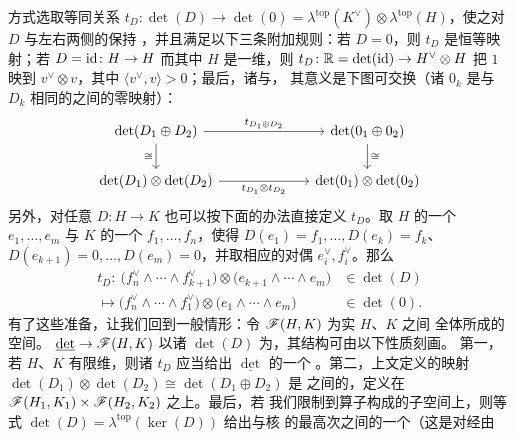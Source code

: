 方式选取等同关系 $t_D\colon\det(D)\to\det(0)=\lambda^{\mathrm{top}}(K^{\vee})\otimes
\lambda^{\mathrm{top}}(H)$，使之对 $D$ 与左右两侧\trIsomorphism{}的\trComposition{}保持%
\trCompatible，并且满足以下三条附加规则：若 $D=0$，则 $t_D$ 是恒等映射；若
$D=\mathrm{id}\colon H\to H$ 而其中 $H$ 是一维\trVectorSpace，则
$t_D\colon\mathbb{R}=\det(\mathrm{id})\to H^{\vee}\otimes H$ 把 $1$ 映到 $v^{\vee}\otimes v$，其中
$\langle v^{\vee},v\rangle>0$；最后，诸\trIsomorphism{}与\trDirectSum{}\trCompatible，
其意义是下图可交换（诸 $0_k$ 是与 $D_k$ 相同的\trVectorSpace{}之间的零映射）：
\begin{equation*}
\begin{tikzcd}[column sep=6.5em]
\det(D_1\oplus D_2)\ar[r,"t_{D_1\oplus D_2}"]\ar[d,"\cong"']
  & \det(0_1\oplus 0_2)\ar[d,"\cong"]\\
\det(D_1)\otimes\det(D_2)\ar[r,"t_{D_1}\otimes t_{D_2}"']
  & \det(0_1)\otimes\det(0_2)
\end{tikzcd}
\end{equation*}
另外，对任意 $D\colon H\to K$ 也可以按下面的办法直接定义 $t_D$。取 $H$ 的一个\trBasis{}
$e_1,\ldots,e_m$ 与 $K$ 的一个\trBasis{} $f_1,\ldots,f_n$，使得
$D(e_1)=f_1,\ldots,D(e_k)=f_k$、$D(e_{k+1})=0,\ldots,D(e_m)=0$，并取相应的对偶\trBasis{}
$e_i^{\vee},f_i^{\vee}$。那么
\begin{equation}\label{eq:det-explicit-td}
\begin{split}
t_D:\ \bigl(f_n^{\vee}\wedge\cdots\wedge f_{k+1}^{\vee}\bigr)\otimes
\bigl(e_{k+1}\wedge\cdots\wedge e_m\bigr)&\in\det(D)\\
\longmapsto\bigl(f_n^{\vee}\wedge\cdots\wedge f_1^{\vee}\bigr)\otimes
\bigl(e_1\wedge\cdots\wedge e_m\bigr)&\in\det(0).
\end{split}
\end{equation}
有了这些准备，让我们回到一般情形：令 $\mathscr{F}(H,K)$ 为实\trBanachSpace{} $H$、$K$ 之间
全体\trFredholmOperator{}所成的空间。\trDeterminantLine{}\trLineBundle{}
$\underline{\det}\to\mathscr{F}(H,K)$ 以诸 $\det(D)$ 为\trFiber，其\trTopology{}结构可由以下性质刻画。
第一，若 $H$、$K$ 有限维，则诸\trIsomorphism{} $t_D$ 应当给出 $\underline{\det}$ 的一个%
\trTrivialization。第二，上文定义的映射
$\det(D_1)\otimes\det(D_2)\cong\det(D_1\oplus D_2)$ 是\trDeterminantLine{}\trLineBundle{}
之间的\trIsomorphism，定义在 $\mathscr{F}(H_1,K_1)\times\mathscr{F}(H_2,K_2)$ 之上。最后，若
我们限制到\trSurjective{}算子构成的子空间上，则等式
$\det(D)=\lambda^{\mathrm{top}}(\ker(D))$ 给出\trDeterminantLine{}\trLineBundle{}与核%
\trVectorBundle{}的最高次\trExteriorPower{}之间的一个\trIsomorphism（这是对经由%
